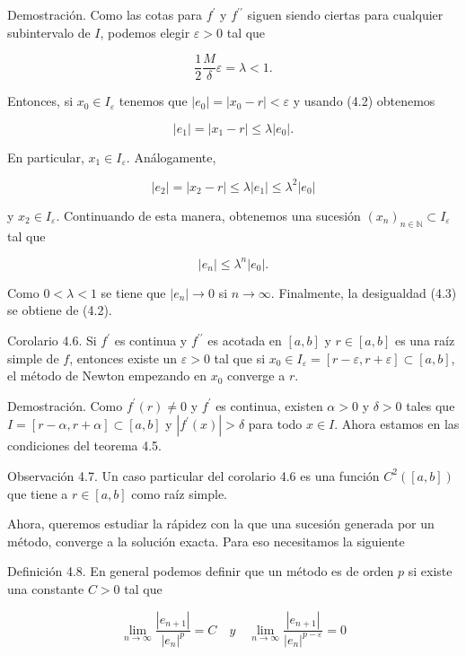 \documentclass[10pt]{article}
\begin{document}
Demostración. Como las cotas para $f^{\prime}$ y $f^{\prime \prime}$ siguen siendo ciertas para cualquier subintervalo de $I$, podemos elegir $\varepsilon>0$ tal que

$$
\frac{1}{2} \frac{M}{\delta} \varepsilon=\lambda<1 .
$$

Entonces, si $x_{0} \in I_{\varepsilon}$ tenemos que $\left|e_{0}\right|=\left|x_{0}-r\right|<\varepsilon$ y usando (4.2) obtenemos

$$
\left|e_{1}\right|=\left|x_{1}-r\right| \leq \lambda\left|e_{0}\right| .
$$

En particular, $x_{1} \in I_{\varepsilon}$. Análogamente,

$$
\left|e_{2}\right|=\left|x_{2}-r\right| \leq \lambda\left|e_{1}\right| \leq \lambda^{2}\left|e_{0}\right|
$$

y $x_{2} \in I_{\varepsilon}$. Continuando de esta manera, obtenemos una sucesión $\left(x_{n}\right)_{n \in \mathbb{N}} \subset I_{\varepsilon}$ tal que

$$
\left|e_{n}\right| \leq \lambda^{n}\left|e_{0}\right| .
$$

Como $0<\lambda<1$ se tiene que $\left|e_{n}\right| \rightarrow 0$ si $n \rightarrow \infty$. Finalmente, la desigualdad (4.3) se obtiene de (4.2).

Corolario 4.6. Si $f^{\prime}$ es continua y $f^{\prime \prime}$ es acotada en $[a, b]$ y $r \in[a, b]$ es una raíz simple de $f$, entonces existe un $\varepsilon>0$ tal que si $x_{0} \in I_{\varepsilon}=[r-\varepsilon, r+\varepsilon] \subset[a, b]$, el método de Newton empezando en $x_{0}$ converge a $r$.

Demostración. Como $f^{\prime}(r) \neq 0$ y $f^{\prime}$ es continua, existen $\alpha>0$ y $\delta>0$ tales que $I=[r-\alpha, r+\alpha] \subset [a, b]$ y $\left|f^{\prime}(x)\right|>\delta$ para todo $x \in I$. Ahora estamos en las condiciones del teorema 4.5.

Observación 4.7. Un caso particular del corolario 4.6 es una función $C^{2}([a, b])$ que tiene a $r \in[a, b]$ como raíz simple.

Ahora, queremos estudiar la rápidez con la que una sucesión generada por un método, converge a la solución exacta. Para eso necesitamos la siguiente

Definición 4.8. En general podemos definir que un método es de orden $p$ si existe una constante $C>0$ tal que

$$
\lim _{n \rightarrow \infty} \frac{\left|e_{n+1}\right|}{\left|e_{n}\right|^{p}}=C \quad y \quad \lim _{n \rightarrow \infty} \frac{\left|e_{n+1}\right|}{\left|e_{n}\right|^{p-\varepsilon}}=0
$$
\end{document}
